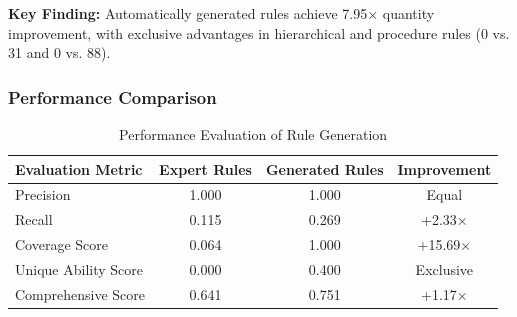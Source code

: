\documentclass[runningheads]{llncs}
\begin{document}
\textbf{Key Finding:} Automatically generated rules achieve 7.95× quantity improvement, with exclusive advantages in hierarchical and procedure rules (0 vs. 31 and 0 vs. 88).

\subsubsection{Performance Comparison}

\begin{table}[H]
    \centering
    \caption{Performance Evaluation of Rule Generation}
    \label{tab:rule_performance}
    \begin{tabular}{l c c c}
    \toprule
    Evaluation Metric & Expert Rules & Generated Rules & Improvement \\
    \midrule
    Precision & 1.000 & 1.000 & Equal \\
    Recall & 0.115 & 0.269 & +2.33× \\
    Coverage Score & 0.064 & 1.000 & +15.69× \\
    Unique Ability Score & 0.000 & 0.400 & Exclusive \\
    Comprehensive Score & 0.641 & 0.751 & +1.17× \\
    \bottomrule
    \end{tabular}
\end{table}
\end{document}

